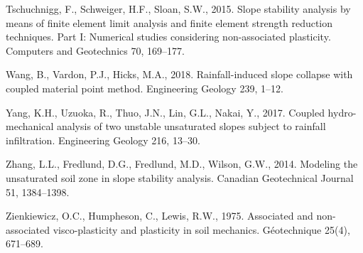 Tschuchnigg, F., Schweiger, H.F., Sloan, S.W., 2015. Slope stability analysis by means of finite element limit
analysis and finite element strength reduction techniques. Part I: Numerical studies considering non-associated
plasticity. Computers and Geotechnics 70, 169--177. %

Wang, B., Vardon, P.J., Hicks, M.A., 2018. Rainfall-induced slope collapse with coupled material point method.
Engineering Geology 239, 1--12.

Yang, K.H., Uzuoka, R., Thuo, J.N., Lin, G.L., Nakai, Y., 2017. Coupled hydro-mechanical analysis of two unstable
unsaturated slopes subject to rainfall infiltration. Engineering Geology 216, 13--30. %

Zhang, L.L., Fredlund, D.G., Fredlund, M.D., Wilson, G.W., 2014. Modeling the unsaturated soil zone in slope
stability analysis. Canadian Geotechnical Journal 51, 1384--1398.

Zienkiewicz, O.C., Humpheson, C., Lewis, R.W., 1975. Associated and non-associated visco-plasticity and plasticity in
soil mechanics. G\'eotechnique 25(4), 671--689.

